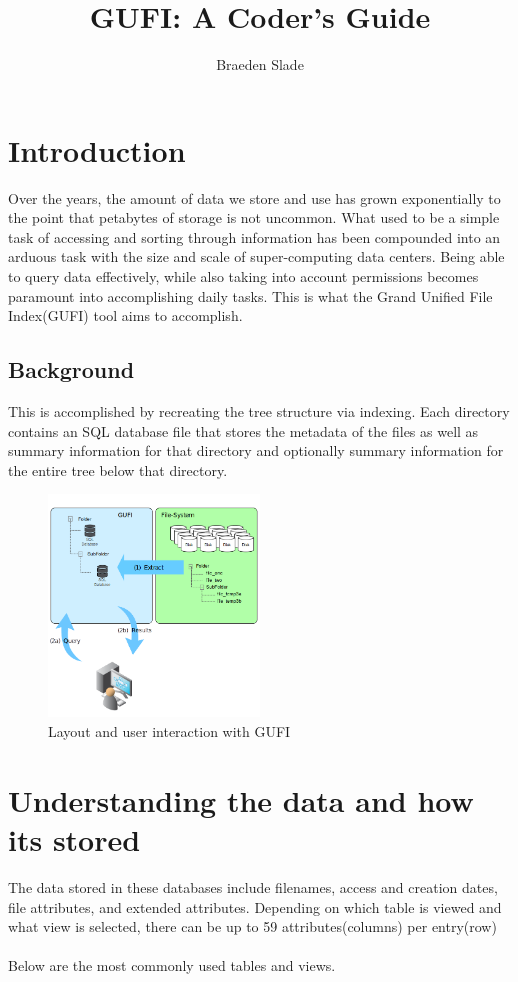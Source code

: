 \documentclass{article}
\title{GUFI: A Coder's Guide}
\author{Braeden Slade}
\begin{document}
\maketitle

\section{Introduction}
Over the years, the amount of data we store and use has grown exponentially to the point that petabytes of storage is not uncommon. What used to be a simple task of accessing and sorting through information has been compounded into an arduous task with the size and scale of super-computing data centers. Being able to query data effectively, while also taking into account permissions becomes paramount into accomplishing daily tasks. This is what the Grand Unified File Index(GUFI) tool aims to accomplish. 

\subsection{Background}
This is accomplished by recreating the tree structure via indexing. Each directory contains an SQL database file that stores the metadata of the files as well as summary information for that directory and optionally summary information for the entire tree below that directory.

\begin{figure} [h]
\centering
\includegraphics[width=0.5\textwidth]{gufi_structure.png}
\caption{\label{fig:gufi\_structure}Layout and user interaction with GUFI}
\end{figure}

\clearpage

\section{Understanding the data and how its stored}
The data stored in these databases include filenames, access and creation dates, file attributes, and extended attributes. Depending on which table is viewed and what view is selected, there can be up to 59 attributes(columns) per entry(row)\\
\\
Below are the most commonly used tables and views. 
\end{document}
